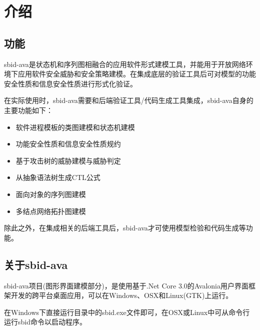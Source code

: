 \chapter{介绍}

\section{功能}
sbid-ava是状态机和序列图相融合的应用软件形式建模工具，并能用于开放网络环境下应用软件安全威胁和安全策略建模。在集成底层的验证工具后可对模型的功能安全性质和信息安全性质进行形式化验证。
\par
在实际使用时，sbid-ava需要和后端验证工具/代码生成工具集成，sbid-ava自身的主要功能如下：
    \begin{itemize}
	\item{软件进程模板的类图建模和状态机建模}
	\item{功能安全性质和信息安全性质规约}
	\item{基于攻击树的威胁建模与威胁判定}
	\item{从抽象语法树生成CTL公式}
	\item{面向对象的序列图建模}
	\item{多结点网络拓扑图建模}
	\end{itemize}
\par
除此之外，在集成相关的后端工具后，sbid-ava才可使用模型检验和代码生成等功能。

\section{关于sbid-ava}
sbid-ava项目(图形界面建模部分)，是使用基于.Net Core 3.0的Avalonia用户界面框架开发的跨平台桌面应用，可以在Windows、OSX和Linux(GTK)上运行。
\par
在Windows下直接运行目录中的sbid.exe文件即可，在OSX或Linux中可从命令行运行sbid命令以启动程序。

